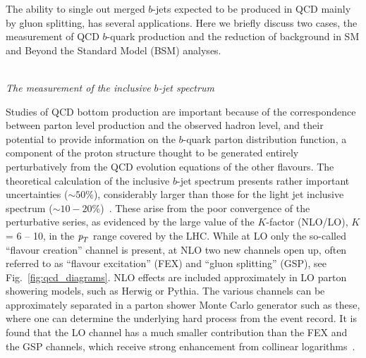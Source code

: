 The ability to single out merged $b$-jets expected to be produced in QCD mainly by gluon splitting,  has several applications.
%
Here we briefly discuss two cases, the measurement of QCD $b$-quark production and the reduction of background in SM and Beyond the Standard Model (BSM) analyses.


\\[5mm]
{\em The measurement of the inclusive $b$-jet spectrum}




Studies of QCD bottom production are important because of the correspondence between parton level production and the observed hadron level, and their potential to provide information on the $b$-quark parton distribution function, a component of the proton structure thought to be generated entirely perturbatively from the QCD evolution equations of the other flavours. The theoretical calculation of the inclusive $b$-jet spectrum presents rather important uncertainties ($\sim 50\%$), considerably larger than those for the light jet inclusive spectrum ($\sim 10-20\%$)~\cite{Frixione:1996nh}. These arise from the poor convergence of the perturbative series, as evidenced by the large value of the $K$-factor (NLO/LO), $K$ = 6 -- 10, in the ${\emph{p}_{T}}$ range covered by the LHC. While at LO only the so-called ``flavour creation'' channel is present, at NLO two new channels open up, often referred to as ``flavour excitation'' (FEX) and ``gluon splitting'' (GSP), see Fig.~\ref{fig:qcd_diagrams}. NLO effects are included approximately in LO parton showering models, such as {\sc Herwig}
or {\sc Pythia}.
The various channels can be approximately separated in a parton shower Monte Carlo generator such as these, where one can determine the underlying hard process from the event record. It is found that the LO channel has a much smaller contribution than 
the FEX and the GSP channels, which
receive strong enhancement from collinear logarithms~\cite{GSP}. 

